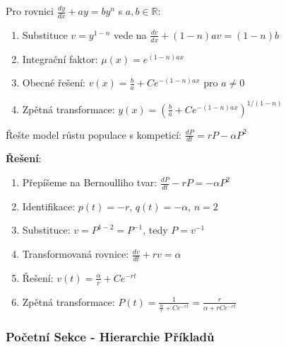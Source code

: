 \vspace{0.8\baselineskip}

\begin{method}
\label{met:l2-konstantni-koeficienty}
Pro rovnici $\frac{dy}{dx} + ay = by^n$ s $a, b \in \mathbb{R}$:

\begin{enumerate}
\item Substituce $v = y^{1-n}$ vede na $\frac{dv}{dx} + (1-n)av = (1-n)b$
\item Integrační faktor: $\mu(x) = e^{(1-n)ax}$
\item Obecné řešení: $v(x) = \frac{b}{a} + Ce^{-(1-n)ax}$ pro $a \neq 0$
\item Zpětná transformace: $y(x) = \left(\frac{b}{a} + Ce^{-(1-n)ax}\right)^{1/(1-n)}$
\end{enumerate}
\end{method}

\vspace{0.6\baselineskip}

\begin{example}
\label{ex:konstantni-koeficienty-populace}
Řešte model růstu populace s kompeticí: $\frac{dP}{dt} = rP - \alpha P^2$

\textbf{Řešení}:
\begin{enumerate}
\item Přepíšeme na Bernoulliho tvar: $\frac{dP}{dt} - rP = -\alpha P^2$
\item Identifikace: $p(t) = -r$, $q(t) = -\alpha$, $n = 2$
\item Substituce: $v = P^{1-2} = P^{-1}$, tedy $P = v^{-1}$
\item Transformovaná rovnice: $\frac{dv}{dt} + rv = \alpha$
\item Řešení: $v(t) = \frac{\alpha}{r} + Ce^{-rt}$
\item Zpětná transformace: $P(t) = \frac{1}{\frac{\alpha}{r} + Ce^{-rt}} = \frac{r}{\alpha + rCe^{-rt}}$
\end{enumerate}
\end{example}

\vspace{0.8\baselineskip}


\subsubsection{Početní Sekce - Hierarchie Příkladů}
\label{subsubsec:pocetni-sekce-bernoulli}

